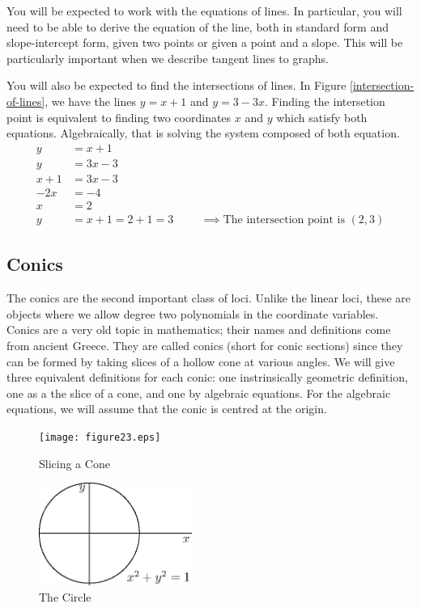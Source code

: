\documentclass[fleqn]{report}
\begin{document}
You will be expected to work with the equations of lines. In
particular, you will need to be able to derive the equation of
the line, both in standard form and slope-intercept form,
given two points or given a point and a slope. This will be
particularly important when we describe tangent lines to
graphs.

You will also be expected to find the intersections of lines.
In Figure \ref{intersection-of-lines}, we have the lines
$y=x+1$ and $y=3-3x$. Finding the intersetion point is
equivalent to finding two coordinates $x$ and $y$ which
satisfy both equations. Algebraically, that is solving the
system composed of both equation.
\begin{align*}
y & = x+1 \\
y & = 3x-3 \\
x+1 & = 3x-3 \\
-2x & = -4 \\
x & = 2 \\
y & = x+1 = 2+1 = 3 \hspace{1cm} \implies \text{The
intersection point is $(2,3)$}
\end{align*}

\subsection{Conics}
\label{conics}

The conics are the second important class of loci. Unlike
the linear loci, these are objects where we allow degree two
polynomials in the coordinate variables. Conics are a very
old topic in mathematics; their names and definitions come
from ancient Greece. They are called conics (short for conic
sections) since they can be formed by taking slices of a
hollow cone at various angles. We will give three equivalent
definitions for each conic: one instrinsically geometric
definition, one as a the slice of a cone, and one by algebraic
equations. For the algebraic equations, we will assume that
the conic is centred at the origin.

\begin{figure}[t]
\centering
\texttt{[image: figure23.eps]}
\caption{Slicing a Cone}
\label{figure-slicing-a-cone}
\end{figure}

\begin{figure}[t]
\centering
\includegraphics[width=5cm]{figure03.eps}
\caption{The Circle}
\label{figure-circle}
\end{figure}
\end{document}
